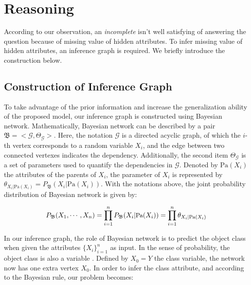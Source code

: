 \section{Reasoning}
\label{sec-reasoning}

According to our observation,  an {\em incomplete}  isn't well satisfying of answering the question because of missing value of hidden attributes.
To infer missing value of hidden attributes, 
an inference graph is required.  
We briefly introduce the construction below. 

\subsection{Construction of Inference Graph}
To take advantage of the prior information and increase the generalization ability of the proposed model, our inference graph is constructed using Bayesian network.
Mathematically, Bayesian network \cite{friedman1997bayesian} can be described by a pair $\mathfrak{B}=<\mathcal{G},\varTheta_\mathcal{G}>$. 
Here, the notation $\mathcal{G}$ is a directed acyclic graph, of which the $i$-th vertex corresponds to a random variable $X_i$, and the edge between two connected vertexes indicates the dependency. 
Additionally, the second item $\varTheta_\mathcal{G}$ is a set of parameters used to quantify the dependencies in $\mathcal{G}$.
Denoted by $\text{Pa}(X_i)$ the attributes of the parents of $X_i$, 
the parameter of $X_i$ is represented by  $\theta_{X_i | \text{Pa}(X_i)} = P_\mathfrak{B}(X_i| \text{Pa}{(X_i)})$.
With the notations above, the joint probability distribution of Bayesian network is given by: 

\begin{equation}\label{eq:BNOri}
\small
P_\mathfrak{B}(X_1, \cdots, X_n) = 
\prod_{i=1}^{n} P_\mathfrak{B}(X_i| \text{Pa}{(X_i)})=
\prod_{i=1}^{n} \theta_{X_i | \text{Pa}(X_i)}
\end{equation}
\vspace{-1ex}

In our inference graph, the role of Bayesian network is to predict the object class when given the attributes $\{X_i\}_{i=1}^n$ as input. In the sense of probability, the object class is also a variable \cite{koller2009probabilistic}.
Defined by $X_0=Y$ the class variable, the network now has one extra vertex $X_0$.
In order to infer the class attribute, and according to the Bayesian rule, our problem becomes:

